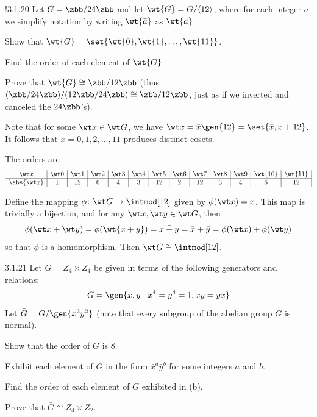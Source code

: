 \begin{exercise}!{3.1.20}
    Let $G = \zbb/24\zbb$ and let $\wt{G} = G/\langle \bar{12} \rangle$, where for each integer $a$ we simplify notation by writing $\wt{\bar a}$ as $\wt{a}$.
    \begin{subexercises}
        \item Show that $\wt{G} = \set{ \wt{0}, \wt{1}, \ldots, \wt{11} }$.
        \item Find the order of each element of $\wt{G}$.
        \item Prove that $\wt{G} \cong \zbb/12\zbb$ (thus $(\zbb/24\zbb)/(12\zbb/24\zbb) \cong \zbb/12\zbb$, just as if we inverted and canceled the $24\zbb$'s).
    \end{subexercises}
\end{exercise}

\begin{solenum}
    \item Note that for some $\wt x \in \wt G$, we have $\wt x = \bar x\gen{12} = \set{\bar x, \bar{x + 12}}$.
	It follows that $x = 0, 1, 2, \dots, 11$ produces distinct cosets.
    \item The orders are
    \[
        \begin{array}{*{13}{c|}}
            \wt x & \wt 0 & \wt 1 & \wt 2 & \wt 3 & \wt 4 & \wt 5 & \wt 6 & \wt 7 & \wt 8 & \wt 9 & \wt{10} & \wt{11} \\
            \hline
            \abs{\wt x} & 1 & 12 & 6 & 4 & 3 & 12 & 2 & 12 & 3 & 4 & 6 & 12
        \end{array}
    \]
    \item Define the mapping $\phi \colon \wt G \to \intmod[12]$ given by $\phi(\wt x) = \bar x$.
	This map is trivially a bijection, and for any $\wt x, \wt y \in \wt G$, then
    \[
    	\phi(\wt x + \wt y) = \phi(\wt{x + y}) = \bar{x + y} = \bar x + \bar y = \phi(\wt x) + \phi(\wt y)
    \]
    so that $\phi$ is a homomorphism.
	Then $\wt G \cong \intmod[12]$.
\end{solenum}

\begin{exercise}{3.1.21}
    Let $G = Z_4 \times Z_4$ be given in terms of the following generators and relations:
    \[
    	G = \gen{x, y \mid x^4 = y^4 = 1, xy = yx}
    \]
    Let $\bar G = G/\gen{x^2y^2}$ (note that every subgroup of the abelian group $G$ is normal).
    \begin{subexercises}
        \item Show that the order of $\bar G$ is 8.
        \item Exhibit each element of $\bar G$ in the form $\bar x^a \bar y^b$ for some integers $a$ and $b$.
        \item Find the order of each element of $\bar G$ exhibited in (b).
        \item Prove that $\bar G \cong Z_4 \times Z_2$.
    \end{subexercises}
\end{exercise}

